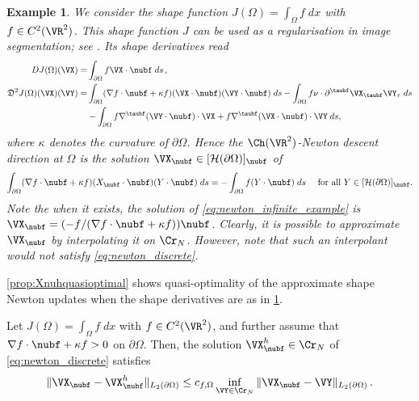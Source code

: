 \documentclass{siamart1116}
\newtheorem{example}[theorem]{Example}
\numberwithin{theorem}{section}
\begin{document}
\begin{example}\label{ex:unconstrained}
We consider the shape function $J(\Omega) = \int_{\Omega}f\; dx$ with $f\in C^2(\VR^2)$. This shape function $J$ can be used as a regularisation in image segmentation; see \cite{MR2049659}. Its shape derivatives read \cite{sturm3}
\begin{align}
DJ(\Omega)(\VX) = &\int_{\partial \Omega} f \VX\cdot \nubf\; ds\,,\\
\mathfrak D^2J(\Omega)(\VX)(\VY) =& \int_{\partial \Omega}  ( \nabla f\cdot \nubf + \kappa f) (\VX\cdot \nubf)(\VY\cdot \nubf)\; ds- \int_{\partial \Omega} f\nu\cdot \partial^{\taubf}\VX_{\taubf}\VY_\tau\;ds \\
\nonumber
&-  \int_{\partial \Omega} f\nabla^{\taubf} (\VY\cdot \nubf)\cdot \VX + f\nabla^{\taubf} (\VX\cdot \nubf)\cdot \VY\; ds,
\end{align}
where $\kappa$ denotes the curvature of $\partial \Omega$. 
Hence the $\Ch(\VR^2)$-Newton descent direction at $\Omega$ is the solution
$\VX_{\nubf}\in [\mathcal H(\partial \Omega)]_{\nubf}$ of
\begin{equation}\label{eq:newton_infinite_example}
\int_{\partial \Omega}  ( \nabla f\cdot \nubf + \kappa f) (X_{\nubf}\cdot \nubf)(Y\cdot \nubf)\; ds = - \int_{\partial \Omega} f (Y\cdot \nubf) \; ds \quad \text{ for all } Y \in [\mathcal H(\partial \Omega)]_{\nubf}.
\end{equation}
Note the when it exists, the solution of \cref{eq:newton_infinite_example} is
$\VX_{\nubf} = (-f/(\nabla f\cdot \nubf+ \kappa f))\nubf$.
Clearly, it is possible to approximate $\VX_{\nubf}$
by interpolating it on $\Cr_N$. However, note that such
an interpolant would not satisfy \cref{eq:newton_discrete}.
\end{example}

\cref{prop:Xnuhquasioptimal} shows quasi-optimality of the approximate
shape Newton updates when the shape derivatives are as in \cref{ex:unconstrained}.
\begin{proposition}\label{prop:Xnuhquasioptimal}
Let $J(\Omega) = \int_{\Omega}f\; dx$ with $f\in C^2(\VR^2)$, and further assume that $\nabla f\cdot \nubf + \kappa f > 0$ on
$\partial \Omega$. Then, the solution
$\VX_{\nubf}^h\in \Cr_N$ of \cref{eq:newton_discrete}
satisfies
\begin{equation}\label{eq:approxerror_Xnu}
\Vert \VX_{\nubf} - \VX_{\nubf}^h\Vert_{L_2(\partial\Omega)} \leq c_{f,\Omega}
\inf_{\VY\in \Cr_N}
\Vert \VX_{\nubf} - \VY \Vert_{L_2(\partial\Omega)}\,.
\end{equation}
\end{proposition}
\end{document}
